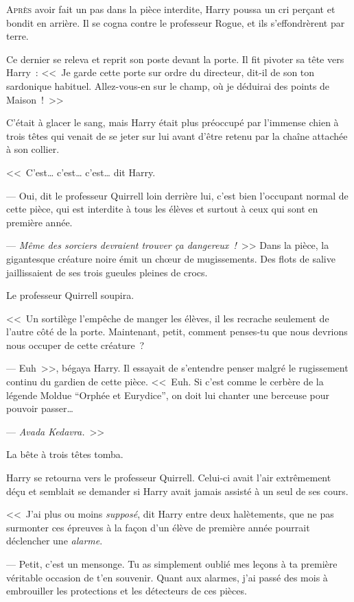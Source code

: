
\lettrine{A}{près} avoir fait un pas dans la pièce interdite, Harry poussa un cri perçant et bondit en arrière. Il se cogna contre le professeur Rogue, et ils s'effondrèrent par terre.

Ce dernier se releva et reprit son poste devant la porte. Il fit pivoter sa tête vers Harry~: <<~Je garde cette porte sur ordre du directeur, dit-il de son ton sardonique habituel. Allez-vous-en sur le champ, où je déduirai des points de Maison~!~>>

C'était à glacer le sang, mais Harry était plus préoccupé par l'immense chien à trois têtes qui venait de se jeter sur lui avant d'être retenu par la chaîne attachée à son collier.

<<~C'est… c'est… c'est… dit Harry.

--- Oui, dit le professeur Quirrell loin derrière lui, c'est bien l'occupant normal de cette pièce, qui est interdite à tous les élèves et surtout à ceux qui sont en première année.

--- \emph{Même des sorciers devraient trouver ça dangereux~!}~>> Dans la pièce, la gigantesque créature noire émit un chœur de mugissements. Des flots de salive jaillissaient de ses trois gueules pleines de crocs.

Le professeur Quirrell soupira.

<<~Un sortilège l'empêche de manger les élèves, il les recrache seulement de l'autre côté de la porte. Maintenant, petit, comment penses-tu que nous devrions nous occuper de cette créature~?

--- Euh~>>, bégaya Harry. Il essayait de s'entendre penser malgré le rugissement continu du gardien de cette pièce. <<~Euh. Si c'est comme le cerbère de la légende Moldue “Orphée et Eurydice”, on doit lui chanter une berceuse pour pouvoir passer…

--- \emph{Avada Kedavra.}~>>

La bête à trois têtes tomba.

Harry se retourna vers le professeur Quirrell. Celui-ci avait l'air extrêmement déçu et semblait se demander si Harry avait jamais assisté à un seul de ses cours.

<<~J'ai plus ou moins \emph{supposé}, dit Harry entre deux halètements, que ne pas surmonter ces épreuves à la façon d'un élève de première année pourrait déclencher une \emph{alarme}.

--- Petit, c'est un mensonge. Tu as simplement oublié mes leçons à ta première véritable occasion de t'en souvenir. Quant aux alarmes, j'ai passé des mois à embrouiller les protections et les détecteurs de ces pièces.


